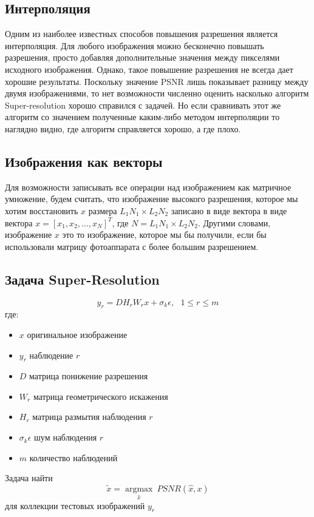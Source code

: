 \subsection{Интерполяция}
Одним из наиболее известных способов повышения разрешения является интерполяция. Для любого изображения можно бесконечно
повышать разрешения, просто добавляя дополнительные значения между пикселями исходного изображения. Однако, такое
повышение разрешения не всегда дает хорошие результаты. Поскольку значение PSNR лишь показывает разницу между двумя
изображениями, то нет возможности численно оценить насколько алгоритм Super-resolution хорошо справился с задачей. Но
если сравнивать этот же алгоритм со значением полученные каким-либо методом интерполяции то наглядно видно, где алгоритм
справляется хорошо, а где плохо.

\subsection{Изображения как векторы}
Для возможности записывать все операции над изображением как матричное умножение, будем считать, что изображение
высокого разрешения, которое мы хотим восстановить $x$ размера $L_{1}N_{1}\times L_{2}N_{2}$ записано в виде вектора в
виде вектора $x=[x_{1},x_{2},\dots,x_{N}]^{T}$, где $N=L_{1}{N_{1}\times L_{2}N_{2}}$. Другими словами, изображение $x$
это то изображение, которое мы бы получили, если бы использовали матрицу фотоаппарата с более большим разрешением.

\subsection{Задача Super-Resolution}
$$y_r = D H_r W_r x +\sigma_{k}\epsilon,~ ~ ~ 1 \leq r \leq m$$
 где:
 \begin{itemize}
   \item $x$ оригинальное изображение
   \item $y_r$ наблюдение $r$
   \item $D$ матрица понижение разрешения
   \item $W_r$ матрица геометрического искажения
   \item $H_r$ матрица размытия наблюдения $r$
   \item $\sigma_{k}\epsilon$ шум наблюдения $r$
   \item $m$ количество наблюдений
 \end{itemize}
 Задача найти
 $$ \tilde{x} = \underset{\hat{x}}{\operatorname{argmax}}~  PSNR(\hat{x},x)$$
для коллекции тестовых изображений $y_r$


